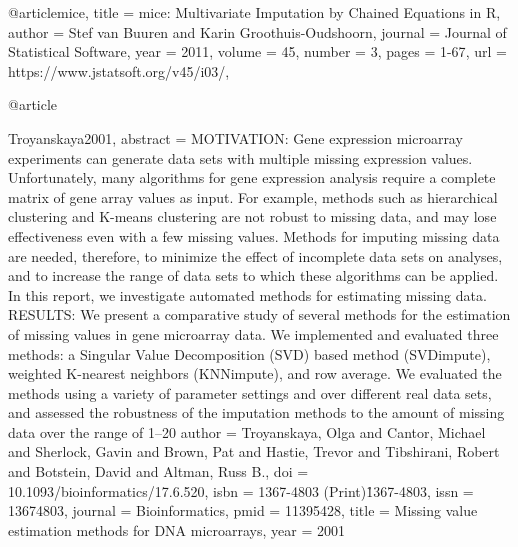 {   @article{mice,
    title = {{mice}: Multivariate Imputation by Chained Equations in R},
    author = {Stef {van Buuren} and Karin Groothuis-Oudshoorn},
    journal = {Journal of Statistical Software},
    year = {2011},
    volume = {45},
    number = {3},
    pages = {1-67},
    url = {https://www.jstatsoft.org/v45/i03/},
  }
  
  @article{Troyanskaya2001,
abstract = {MOTIVATION: Gene expression microarray experiments can generate data sets with multiple missing expression values. Unfortunately, many algorithms for gene expression analysis require a complete matrix of gene array values as input. For example, methods such as hierarchical clustering and K-means clustering are not robust to missing data, and may lose effectiveness even with a few missing values. Methods for imputing missing data are needed, therefore, to minimize the effect of incomplete data sets on analyses, and to increase the range of data sets to which these algorithms can be applied. In this report, we investigate automated methods for estimating missing data. RESULTS: We present a comparative study of several methods for the estimation of missing values in gene microarray data. We implemented and evaluated three methods: a Singular Value Decomposition (SVD) based method (SVDimpute), weighted K-nearest neighbors (KNNimpute), and row average. We evaluated the methods using a variety of parameter settings and over different real data sets, and assessed the robustness of the imputation methods to the amount of missing data over the range of 1--20%
author = {Troyanskaya, Olga and Cantor, Michael and Sherlock, Gavin and Brown, Pat and Hastie, Trevor and Tibshirani, Robert and Botstein, David and Altman, Russ B.},
doi = {10.1093/bioinformatics/17.6.520},
isbn = {1367-4803 (Print)\r1367-4803},
issn = {13674803},
journal = {Bioinformatics},
pmid = {11395428},
title = {{Missing value estimation methods for DNA microarrays}},
year = {2001}
}

}}
